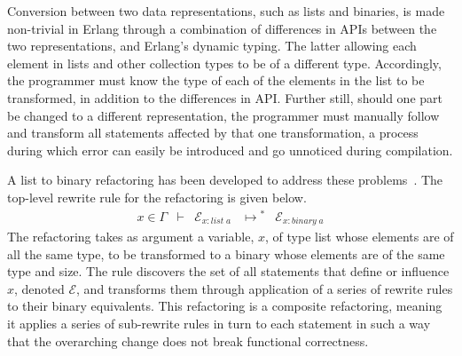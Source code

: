 \documentclass[final]{jfp1}
\newcommand{\type}[3]{#1: #2\; #3}
\newcommand{\ing}[1]{#1 \in{} \Gamma}
\newcommand{\Rewrite}[3]{#1 & \vdash{} & #2 & \mapsto{}^{\!\!\!*} & #3}
\begin{document}
Conversion between two data representations, such as lists and binaries, is made
non-trivial in Erlang through a combination of differences in APIs between the
two representations, and Erlang's dynamic typing. The latter allowing each
element in lists and other collection types to be of a different type.
Accordingly, the programmer must know the type of each of the elements in the
list to be transformed, in addition to the differences in API. Further still,
should one part be changed to a different representation, the programmer must
manually follow and transform all statements affected by that one
transformation, a process during which error can easily be introduced and go
unnoticed during compilation.

A list to binary refactoring has been developed to address these problems~\cite{Barwell:2016:TSD}.
The top-level rewrite rule for the refactoring is given below.
% 
\[
  \begin{array}{rclcl}
    \Rewrite{\ing{x}}{\mathcal{E}_{\type{x}{list}{a}}}{\mathcal{E}_{\type{x}{binary}{a}} }
  \end{array}
\]
% 
The refactoring takes as argument a variable, $x$, of type list whose elements
are of all the same type, to be transformed to a binary whose elements are of
the same type and size. The rule discovers the set of all statements that define
or influence $x$, denoted $\mathcal{E}$, and transforms them through application
of a series of rewrite rules to their binary equivalents. This refactoring is a
composite refactoring, meaning it applies a series of sub-rewrite rules in turn
to each statement in such a way that the overarching change does not break
functional correctness.
% 
\end{document}

